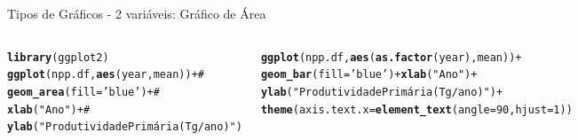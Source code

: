 \documentclass{beamer}\usepackage[]{graphicx}\usepackage[]{color}
\makeatletter
\newcommand{\hlnum}[1]{\textcolor[rgb]{0.686,0.059,0.569}{#1}}%
\newcommand{\hlstr}[1]{\textcolor[rgb]{0.192,0.494,0.8}{#1}}%
\newcommand{\hlcom}[1]{\textcolor[rgb]{0.678,0.584,0.686}{\textit{#1}}}%
\newcommand{\hlopt}[1]{\textcolor[rgb]{0,0,0}{#1}}%
\newcommand{\hlstd}[1]{\textcolor[rgb]{0.345,0.345,0.345}{#1}}%
\newcommand{\hlkwc}[1]{\textcolor[rgb]{0.333,0.667,0.333}{#1}}%
\newcommand{\hlkwd}[1]{\textcolor[rgb]{0.737,0.353,0.396}{\textbf{#1}}}%
\newenvironment{kframe}{%
 \def\at@end@of@kframe{}%
 \ifinner\ifhmode%
  \def\at@end@of@kframe{\end{minipage}}%
  \begin{minipage}{\columnwidth}%
 \fi\fi%
 \def\FrameCommand##1{\hskip\@totalleftmargin \hskip-\fboxsep
 \colorbox{shadecolor}{##1}\hskip-\fboxsep
     \hskip-\linewidth \hskip-\@totalleftmargin \hskip\columnwidth}%
 \MakeFramed {\advance\hsize-\width
   \@totalleftmargin\z@ \linewidth\hsize
   \@setminipage}}%
 {\par\unskip\endMakeFramed%
 \at@end@of@kframe}
\newenvironment{knitrout}{}{} %
\renewenvironment{knitrout}{\setlength{\topsep}{0mm}}{}
\makeatother
\begin{document}
\begin{frame}[fragile]{Tipos de Gráficos - 2 variáveis: Gráfico de Área}

\begin{columns}[t]


\begin{knitrout}\tiny
{}\color{fgcolor}\begin{kframe}
\begin{alltt}
\hlkwd{library}\hlstd{(ggplot2)}
\hlkwd{ggplot}\hlstd{(npp.df,}\hlkwd{aes}\hlstd{(year,mean))} \hlopt{+} \hlcom{#}
  \hlkwd{geom_area}\hlstd{(}\hlkwc{fill}\hlstd{=}\hlstr{'blue'}\hlstd{)} \hlopt{+}\hlcom{#}
  \hlkwd{xlab}\hlstd{(}\hlstr{"Ano"}\hlstd{)} \hlopt{+} \hlcom{#}
  \hlkwd{ylab}\hlstd{(}\hlstr{"Produtividade Primária (Tg/ano)"}\hlstd{)}

\hlkwd{ggplot}\hlstd{(npp.df,}\hlkwd{aes}\hlstd{(}\hlkwd{as.factor}\hlstd{(year),mean))} \hlopt{+}
  \hlkwd{geom_bar}\hlstd{(}\hlkwc{fill}\hlstd{=}\hlstr{'blue'}\hlstd{)} \hlopt{+}\hlkwd{xlab}\hlstd{(}\hlstr{"Ano"}\hlstd{)} \hlopt{+}
  \hlkwd{ylab}\hlstd{(}\hlstr{"Produtividade Primária (Tg/ano)"}\hlstd{)} \hlopt{+}
  \hlkwd{theme}\hlstd{(}\hlkwc{axis.text.x} \hlstd{=} \hlkwd{element_text}\hlstd{(}\hlkwc{angle} \hlstd{=} \hlnum{90}\hlstd{,} \hlkwc{hjust} \hlstd{=} \hlnum{1}\hlstd{))}
\end{alltt}
\end{kframe}
\end{knitrout}


\begin{knitrout}
\color{fgcolor}
\includegraphics[width=1\linewidth]{figure/unnamed-chunk-69-1} 


\end{knitrout}
\end{columns}
\end{frame}
\end{document}
